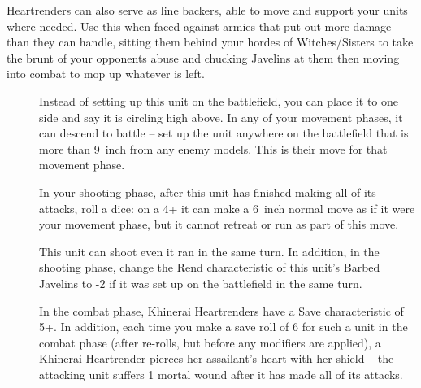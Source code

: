Heartrenders can also serve as line backers, able to move and support your
    units where needed. Use this when faced against armies that put out more
    damage than they can handle, sitting them behind your hordes of
    Witches/Sisters to take the brunt of your opponents abuse and chucking
    Javelins at them then moving into combat to mop up whatever is left. \\

\begin{description}
    \item [] Instead of setting
        up this unit on the battlefield, you can place it to one side and say
        it is circling high above. In any of your movement phases, it can
        descend to battle – set up the unit anywhere on the battlefield that is
        more than 9~inch from any enemy models. This is their move for that
        movement phase.
    \item [] In your shooting phase,
        after this unit has finished making all of its attacks, roll a dice: on
        a 4+ it can make a 6~inch normal move as if it were your movement
        phase, but it cannot retreat or run as part of this move.
    \item [] This unit can shoot
        even it ran in the same turn.  In addition, in the shooting phase,
        change the Rend characteristic of this unit’s Barbed Javelins to -2 if
        it was set up on the battlefield in the same turn. 
    \item [] In the combat
        phase, Khinerai Heartrenders have a Save characteristic of 5+. In
        addition, each time you make a save roll of 6 for such a unit in the
        combat phase (after re-rolls, but before any modifiers are applied),
        a Khinerai Heartrender pierces her assailant’s heart with her shield
        – the attacking unit suffers 1 mortal wound after it has made all of
        its attacks.
\end{description}



